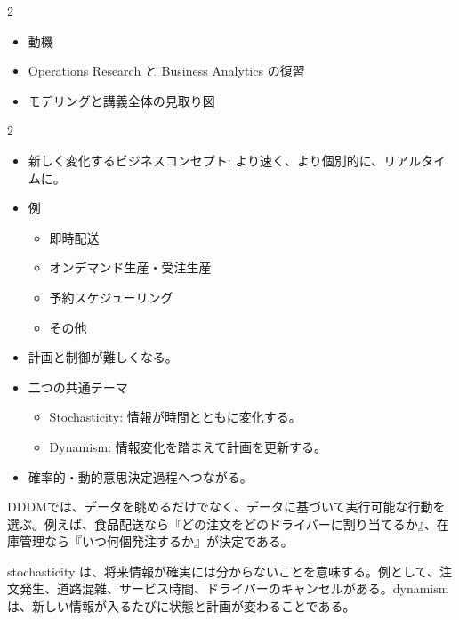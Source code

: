 \clearpage
{}
\begin{multicols}{2}\scriptsize\raggedcolumns
{}
\begin{itemize}
\item 動機
\item Operations Research と Business Analytics の復習
\item モデリングと講義全体の見取り図
\end{itemize}
\end{multicols}

\clearpage
{}
\begin{multicols}{2}\footnotesize\raggedcolumns
{}
\begin{itemize}
\item 新しく変化するビジネスコンセプト: より速く、より個別的に、リアルタイムに。
\item 例
\begin{itemize}
\item 即時配送
\item オンデマンド生産・受注生産
\item 予約スケジューリング
\item その他
\end{itemize}
\item 計画と制御が難しくなる。
\item 二つの共通テーマ
\begin{itemize}
\item Stochasticity: 情報が時間とともに変化する。
\item Dynamism: 情報変化を踏まえて計画を更新する。
\end{itemize}
\item 確率的・動的意思決定過程へつながる。
\end{itemize}
DDDMでは、データを眺めるだけでなく、データに基づいて実行可能な行動を選ぶ。例えば、食品配送なら『どの注文をどのドライバーに割り当てるか』、在庫管理なら『いつ何個発注するか』が決定である。\par

stochasticity は、将来情報が確実には分からないことを意味する。例として、注文発生、道路混雑、サービス時間、ドライバーのキャンセルがある。dynamism は、新しい情報が入るたびに状態と計画が変わることである。\par


\end{multicols}

